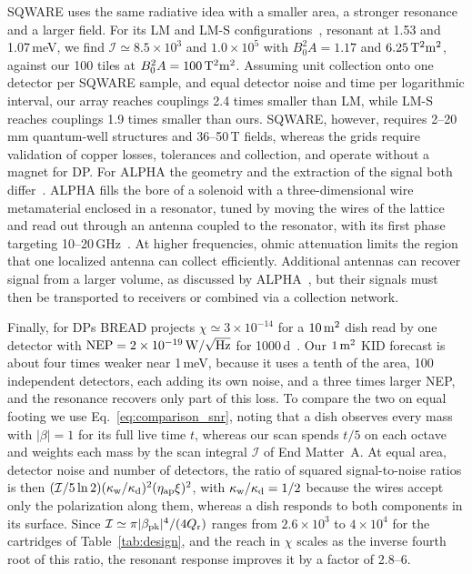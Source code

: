 \documentclass[
  aps,prl,reprint,superscriptaddress,
  amsmath,amssymb,floatfix,nofootinbib
]{revtex4-2}
\newcommand{\Qr}{Q_{\rm r}}
\begin{document}
SQWARE uses the same radiative idea with a smaller area, a stronger resonance and a larger field. For its LM and LM-S configurations~\cite{Mehrani:2025ryc}, resonant at 1.53 and 1.07\,meV, we find $\mathcal I\simeq8.5\times10^3$ and $1.0\times10^5$ with $B_0^2A=1.17$ and $6.25\,{\rm T^2m^2}$, against our 100 tiles at $B_0^2A=100\,{\rm T^2m^2}$. Assuming unit collection onto one detector per SQWARE sample, and equal detector noise and time per logarithmic interval, our array reaches couplings 2.4 times smaller than LM, while LM-S reaches couplings 1.9 times smaller than ours. SQWARE, however, requires 2--20\,mm quantum-well structures and 36--50\,T fields, whereas the grids require validation of copper losses, tolerances and collection, and operate without a magnet for DP. For ALPHA the geometry and the extraction of the signal both differ~\cite{Lawson:2019brd,ALPHA:2022rxj}. ALPHA fills the bore of a solenoid with a three-dimensional wire metamaterial enclosed in a resonator, tuned by moving the wires of the lattice and read out through an antenna coupled to the resonator, with its first phase targeting 10--20\,GHz~\cite{ALPHA:2026phase1}. At higher frequencies, ohmic attenuation limits the region that one localized antenna can collect efficiently. Additional antennas can recover signal from a larger volume, as discussed by ALPHA~\cite{ALPHA:2022rxj}, but their signals must then be transported to receivers or combined via a collection network. 

Finally, for DPs BREAD projects $\chi\simeq3\times10^{-14}$ for a $10\,{\rm m^2}$ dish read by one detector with ${\rm NEP}=2\times10^{-19}\,{\rm W/\sqrt{Hz}}$ for 1000\,d~\cite{BREAD:2021tpx}. Our $1\,{\rm m^2}$ KID forecast is about four times weaker near 1\,meV, because it uses a tenth of the area, 100 independent detectors, each adding its own noise, and a three times larger NEP, and the resonance recovers only part of this loss. To compare the two on equal footing we use Eq.~\eqref{eq:comparison_snr}, noting that a dish observes every mass with $|\beta|=1$ for its full live time $t$, whereas our scan spends $t/5$ on each octave and weights each mass by the scan integral $\mathcal I$ of End Matter~A. At equal area, detector noise and number of detectors, the ratio of squared signal-to-noise ratios is then $(\mathcal I/5\ln2)(\kappa_{\rm w}/\kappa_{\rm d})^2(\eta_{\rm ap}\xi)^2$, with $\kappa_{\rm w}/\kappa_{\rm d}=1/2$ because the wires accept only the polarization along them, whereas a dish responds to both components in its surface. Since $\mathcal I\simeq\pi|\beta_{\rm pk}|^4/(4\Qr)$ ranges from $2.6\times10^3$ to $4\times10^4$ for the cartridges of Table~\ref{tab:design}, and the reach in $\chi$ scales as the inverse fourth root of this ratio, the resonant response improves it by a factor of 2.8--6.
\end{document}
